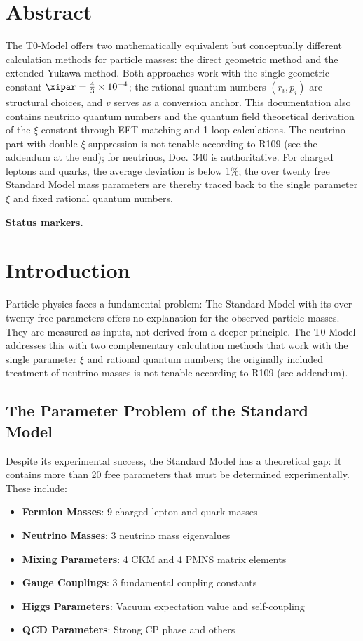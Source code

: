 	\section*{Abstract}
	The T0-Model offers two mathematically equivalent but conceptually different calculation methods for particle masses: the direct geometric method and the extended Yukawa method. Both approaches work with the single geometric constant $\xipar = \frac{4}{3} \times 10^{-4}$; the rational quantum numbers $(r_i, p_i)$ are structural choices, and $v$ serves as a conversion anchor. This documentation also contains neutrino quantum numbers and the quantum field theoretical derivation of the $\xi$-constant through EFT matching and 1-loop calculations. The neutrino part with double $\xi$-suppression is not tenable according to R109 (see the addendum at the end); for neutrinos, Doc.~340 is authoritative. For charged leptons and quarks, the average deviation is below 1\%; the over twenty free Standard Model mass parameters are thereby traced back to the single parameter $\xi$ and fixed rational quantum numbers.

	
\medskip\noindent\textbf{Status markers.}


	\section{Introduction}
	\label{sec:introduction}
	
	Particle physics faces a fundamental problem: The Standard Model with its over twenty free parameters offers no explanation for the observed particle masses. They are measured as inputs, not derived from a deeper principle. The T0-Model addresses this with two complementary calculation methods that work with the single parameter $\xi$ and rational quantum numbers; the originally included treatment of neutrino masses is not tenable according to R109 (see addendum).
	
	\subsection{The Parameter Problem of the Standard Model}
	\label{subsec:parameter_problem}
	
	Despite its experimental success, the Standard Model has a theoretical gap: It contains more than 20 free parameters that must be determined experimentally. These include:
	
	\begin{itemize}
		\item \textbf{Fermion Masses}: 9 charged lepton and quark masses
		\item \textbf{Neutrino Masses}: 3 neutrino mass eigenvalues
		\item \textbf{Mixing Parameters}: 4 CKM and 4 PMNS matrix elements
		\item \textbf{Gauge Couplings}: 3 fundamental coupling constants
		\item \textbf{Higgs Parameters}: Vacuum expectation value and self-coupling
		\item \textbf{QCD Parameters}: Strong CP phase and others
	\end{itemize}
	
